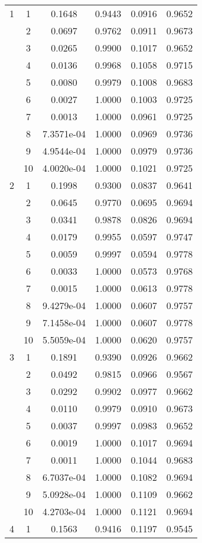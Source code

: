 \begin{center}
\begin{longtable}{|c|c|c|c|c|c|}
1 & 1 & 0.1648 & 0.9443 & 0.0916 & 0.9652 \\
& 2 & 0.0697 & 0.9762 & 0.0911 & 0.9673 \\
& 3 & 0.0265 & 0.9900 & 0.1017 & 0.9652 \\
& 4 & 0.0136 & 0.9968 & 0.1058 & 0.9715 \\
& 5 & 0.0080 & 0.9979 & 0.1008 & 0.9683 \\
& 6 & 0.0027 & 1.0000 & 0.1003 & 0.9725 \\
& 7 & 0.0013 & 1.0000 & 0.0961 & 0.9725 \\
& 8 & 7.3571e-04 & 1.0000 & 0.0969 & 0.9736 \\
& 9 & 4.9544e-04 & 1.0000 & 0.0979 & 0.9736 \\
& 10 & 4.0020e-04 & 1.0000 & 0.1021 & 0.9725 \\
\hline
2 & 1 & 0.1998 & 0.9300 & 0.0837 & 0.9641 \\
& 2 & 0.0645 & 0.9770 & 0.0695 & 0.9694 \\
& 3 & 0.0341 & 0.9878 & 0.0826 & 0.9694 \\
& 4 & 0.0179 & 0.9955 & 0.0597 & 0.9747 \\
& 5 & 0.0059 & 0.9997 & 0.0594 & 0.9778 \\
& 6 & 0.0033 & 1.0000 & 0.0573 & 0.9768 \\
& 7 & 0.0015 & 1.0000 & 0.0613 & 0.9778 \\
& 8 & 9.4279e-04 & 1.0000 & 0.0607 & 0.9757 \\
& 9 & 7.1458e-04 & 1.0000 & 0.0607 & 0.9778 \\
& 10 & 5.5059e-04 & 1.0000 & 0.0620 & 0.9757 \\
\hline
3 & 1 & 0.1891 & 0.9390 & 0.0926 & 0.9662 \\
& 2 & 0.0492 & 0.9815 & 0.0966 & 0.9567 \\
& 3 & 0.0292 & 0.9902 & 0.0977 & 0.9662 \\
& 4 & 0.0110 & 0.9979 & 0.0910 & 0.9673 \\
& 5 & 0.0037 & 0.9997 & 0.0983 & 0.9652 \\
& 6 & 0.0019 & 1.0000 & 0.1017 & 0.9694 \\
& 7 & 0.0011 & 1.0000 & 0.1044 & 0.9683 \\
& 8 & 6.7037e-04 & 1.0000 & 0.1082 & 0.9694 \\
& 9 & 5.0928e-04 & 1.0000 & 0.1109 & 0.9662 \\
& 10 & 4.2703e-04 & 1.0000 & 0.1121 & 0.9694 \\
\hline
4 & 1 & 0.1563 & 0.9416 & 0.1197 & 0.9545 \\

\end{longtable}
\end{center}
